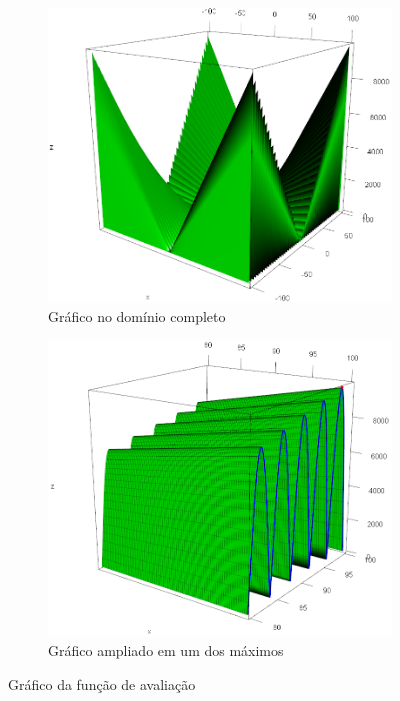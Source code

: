 \begin{figure}[ht]
	\centering
	\begin{subfigure}[b]{0.47\linewidth}
		\includegraphics[width=\linewidth]{imagens/teste1.png}
		\caption{Gráfico no domínio completo}
	\end{subfigure}
	\begin{subfigure}[b]{0.47\linewidth}
		\includegraphics[width=\linewidth]{imagens/teste2.png}
		\caption{Gráfico ampliado em um dos máximos}
	\end{subfigure}
	\caption{Gráfico da função de avaliação}
	\label{fig:grafico_teste1}
\end{figure}

